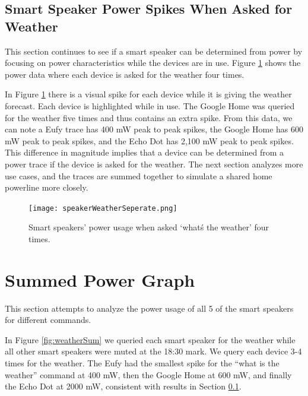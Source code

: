 \subsection{Smart Speaker Power Spikes When Asked for Weather}
\label{Smart Speaker Power Spikes When Asked for Weather}
This section continues to see if a smart speaker can be determined from power by focusing on power characteristics while the devices are in use. Figure \ref{fig:speakerWeatherSeperate} shows the power data where each device is asked for the weather four times.

In Figure \ref{fig:speakerWeatherSeperate} there is a visual spike for each device while it is giving the weather forecast. Each device is highlighted while in use. The Google Home was queried for the weather five times and thus contains an extra spike. From this data, we can note a Eufy trace has 400 mW peak to peak spikes, the Google Home has 600 mW peak to peak spikes, and the Echo Dot has 2,100 mW peak to peak spikes. This difference in magnitude implies that a device can be determined from a power trace if the device is asked for the weather. The next section analyzes more use cases, and the traces are summed together to simulate a shared home powerline more closely.

\begin{figure}[H]
    \centering
    \texttt{[image: speakerWeatherSeperate.png]}
    \caption{Smart speakers' power usage when asked `what\'s the weather' four times.}
    \label{fig:speakerWeatherSeperate}
\end{figure}

\section{Summed Power Graph}
\label{sumPowerGraph}
This section attempts to analyze the power usage of all 5 of the smart speakers for different commands.

In Figure \ref{fig:weatherSum} we queried each smart speaker for the weather while all other smart speakers were muted at the 18:30 mark. We query each device 3-4 times for the weather. The Eufy had the smallest spike for the ``what is the weather'' command at 400 mW, then the Google Home at 600 mW, and finally the Echo Dot at 2000 mW, consistent with results in Section \ref{Smart Speaker Power Spikes When Asked for Weather}.


